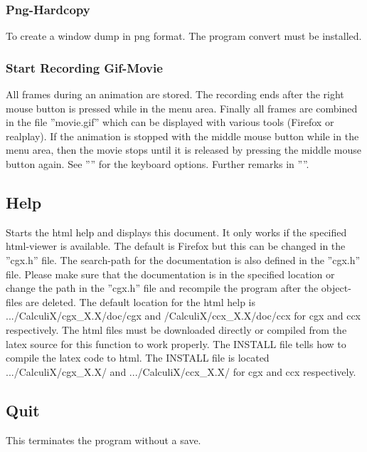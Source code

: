 \documentclass{article}
\begin{document}
\subsubsection{\label{Png-Hardcopy}Png-Hardcopy}
To create a window dump in png format. The program convert must be installed.

\subsubsection{\label{Start Recording Gif-Movie}Start Recording Gif-Movie}
All frames during an animation are stored. The recording ends after the right mouse button is pressed while in the menu area. Finally all frames are combined in the file ''movie.gif'' which can be displayed with various tools (Firefox \cite{Firefox} or realplay). If the animation is stopped with the middle mouse button while in the menu area, then the movie stops until it is released by pressing the middle mouse button again. See '''' for the keyboard options. Further remarks in ''''.

\subsection{\label{Help}Help}
Starts the html help and displays this document. It only works if the specified html-viewer is available. The default is Firefox \cite{Firefox} but this can be changed in the ''cgx.h'' file. The search-path for the documentation is also defined in the ''cgx.h'' file. Please make sure that the documentation is in the specified location or change the path in the ''cgx.h'' file and recompile the program after the object-files are deleted.  The default location for the html help is .../CalculiX/cgx\_X.X/doc/cgx and /CalculiX/ccx\_X.X/doc/ccx for cgx and ccx respectively.  The html files must be downloaded directly or compiled from the latex source for this function to work properly. The INSTALL file tells how to compile the latex code to html.  The INSTALL file is located .../CalculiX/cgx\_X.X/ and .../CalculiX/ccx\_X.X/ for cgx and ccx respectively.

\subsection{\label{Quit}Quit}
This terminates the program without a save.
\end{document}
